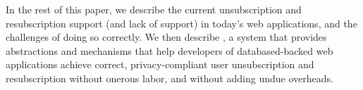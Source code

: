 In the rest of this paper, we describe the current unsubscription and resubscription support (and
lack of support) in today's web applications, and the challenges of doing so correctly.
We then describe \sys, a system that provides abstractions and mechanisms
that help developers of databased-backed web applications achieve correct,
privacy-compliant user unsubscription and resubscription without onerous labor, and without adding
undue overheads.
